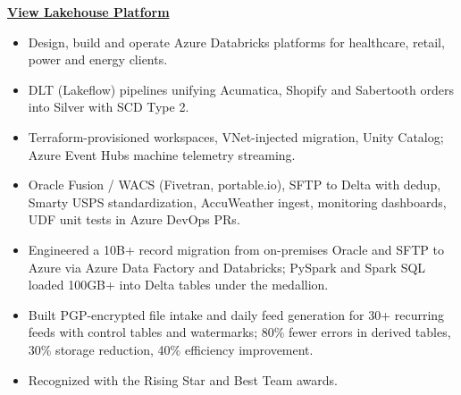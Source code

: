 \documentclass[10pt,a4paper]{article}
\begin{document}
\vspace{0.2em}
\begin{center}
\href{https://github.com/An0N-ops/Azure-Databricks-Lakehouse-Platform}
{\small\sffamily\bfseries\color{accent} View Lakehouse Platform}
\end{center}


\begin{itemize}[leftmargin=1.25em, itemsep=0.6pt, topsep=1.5pt]
  \item Design, build and operate Azure Databricks platforms for
        healthcare, retail, power and energy clients.
  \item DLT (Lakeflow) pipelines unifying Acumatica, Shopify and
        Sabertooth orders into Silver with SCD Type 2.
  \item Terraform-provisioned workspaces, VNet-injected migration, Unity
        Catalog; Azure Event Hubs machine telemetry streaming.
  \item Oracle Fusion / WACS (Fivetran, portable.io), SFTP to Delta with
        dedup, Smarty USPS standardization, AccuWeather ingest, monitoring
        dashboards, UDF unit tests in Azure DevOps PRs.
  \item Engineered a 10B+ record migration from on-premises Oracle and
        SFTP to Azure via Azure Data Factory and Databricks; PySpark and
        Spark SQL loaded 100GB+ into Delta tables under the medallion.
  \item Built PGP-encrypted file intake and daily feed generation for 30+
        recurring feeds with control tables and watermarks; 80\% fewer
        errors in derived tables, 30\% storage reduction, 40\% efficiency
        improvement.
  \item Recognized with the Rising Star and Best Team awards.
\end{itemize}

\end{document}
